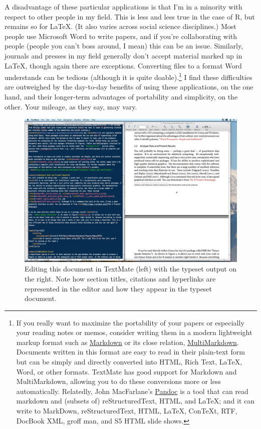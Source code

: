 \documentclass[11pt,article,oneside]{memoir}
\begin{document}
A disadvantage of these particular applications is that I'm in a minority with respect to other people in my field. This is less and less true in the case of R, but remains so for LaTeX. (It also varies across social science disciplines.) Most people use Microsoft Word to write papers, and if you're collaborating with people (people you can't boss around, I mean) this can be an issue. Similarly, journals and presses in my field generally don't accept material marked up in LaTeX, though again there are exceptions. Converting files to a format Word understands can be tedious (although it is quite doable).\footnote{If you really want to maximize the portability of your papers or especially your reading notes or memos, consider writing them in a modern lightweight markup format  such as \href{http://en.wikipedia.org/wiki/Markdown}{Markdown} or its close relation, \href{http://fletcherpenney.net/MultiMarkdown}{MultiMarkdown}. Documents written in this format are easy to read in their plain-text form but can be simply and directly converted into HTML, Rich Text, LaTeX, Word, or other formats. TextMate has good support for Markdown and MultiMarkdown, allowing you to do these conversions more or less automatically. Relatedly, John MacFarlane's \href{http://johnmacfarlane.net/pandoc/}{Pandoc} is a tool that can read markdown and (subsets of) reStructuredText, HTML, and LaTeX; and it can write to MarkDown, reStructuredText, HTML, LaTeX, ConTeXt, RTF, DocBook XML, groff man, and S5 HTML slide shows.} I find these difficulties are outweighed by the day-to-day benefits of using these applications, on the one hand, and their longer-term advantages of portability and simplicity, on the other. Your mileage, as they say, may vary.

\begin{figure}[ht]
	\centering
		\includegraphics[scale=0.2]{figures/TextMateLaTeX}
	\caption{Editing this document in TextMate (left) with the typeset output on the right. Note how section titles, citations and hyperlinks are represented in the editor and how they appear in the typeset document.}
	\label{fig:label}
\end{figure}
\end{document}
